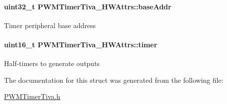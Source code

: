 \paragraph[{base\-Addr}]{\setlength{\rightskip}{0pt plus 5cm}uint32\-\_\-t P\-W\-M\-Timer\-Tiva\-\_\-\-H\-W\-Attrs\-::base\-Addr}\label{struct_p_w_m_timer_tiva___h_w_attrs_a1514de8d9b83a66fbed22b8427d20655}
Timer peripheral base address 
\paragraph[{timer}]{\setlength{\rightskip}{0pt plus 5cm}uint16\-\_\-t P\-W\-M\-Timer\-Tiva\-\_\-\-H\-W\-Attrs\-::timer}\label{struct_p_w_m_timer_tiva___h_w_attrs_aa14d05c47183c46a7314da656125bbc9}
Half-\/timers to generate outputs 

The documentation for this struct was generated from the following file\-:\begin{DoxyCompactItemize}
\item 
\hyperlink{_p_w_m_timer_tiva_8h}{P\-W\-M\-Timer\-Tiva.\-h}\end{DoxyCompactItemize}
